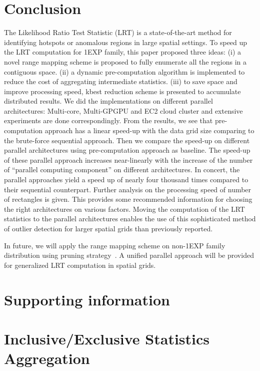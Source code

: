 \documentclass[AMA,LATO1COL]{WileyNJD-v2}
\begin{document}
\section{Conclusion}\label{CC}
The Likelihood Ratio Test Statistic (LRT) is a state-of-the-art method for identifying hotspots or anomalous
regions in large spatial settings. To speed up the LRT computation for 1EXP family, this paper proposed three ideas: (i) a novel range mapping scheme is proposed to fully enumerate all the regions in a contiguous space. (ii) a dynamic pre-computation algorithm is implemented to reduce the cost of aggregating intermediate statistics. (iii) to save space and improve processing speed, kbest reduction scheme is presented to accumulate distributed results. We did the implementations on different parallel architectures: Multi-core, Multi-GPGPU and EC2 cloud cluster and extensive experiments are done correspondingly. From the results, we see that pre-computation approach has a linear speed-up with the data grid size comparing to the brute-force sequential approach. Then we compare the speed-up on different parallel architectures using pre-computation approach as baseline. The speed-up of these parallel approach increases near-linearly with the increase of the number of ``parallel
computing component'' on different architectures. In concert, the parallel approaches yield a speed up of nearly four thousand times compared to
their sequential counterpart. Further analysis on the processing speed of number of rectangles is given. This provides some recommended information for choosing the right architectures on various factors. Moving the computation of the LRT statistics to the parallel architectures enables the use of this sophisticated method of outlier detection for larger
spatial grids than previously reported.

In future, we will apply the range mapping scheme on non-1EXP family distribution using pruning strategy~\cite{jour}. A unified parallel approach will be provided for generalized LRT computation in spatial grids.

\section*{Supporting information}

\section{Inclusive/Exclusive Statistics Aggregation }
\end{document}
